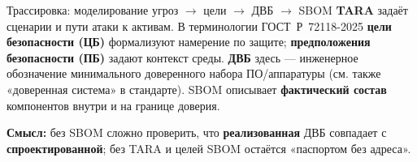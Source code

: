 \documentclass[aspectratio=169,10pt]{beamer}
\begin{document}
\begin{frame}{Трассировка: моделирование угроз $\rightarrow$ цели $\rightarrow$ ДВБ $\rightarrow$ SBOM}
\footnotesize
\textbf{TARA} задаёт сценарии и пути атаки к активам. В терминологии ГОСТ~Р~72118-2025 \textbf{цели безопасности (ЦБ)} формализуют намерение по защите; \textbf{предположения безопасности (ПБ)} задают контекст среды. \textbf{ДВБ} здесь — инженерное обозначение минимального доверенного набора ПО/аппаратуры (см. также «доверенная система» в стандарте). SBOM описывает \textbf{фактический состав} компонентов внутри и на границе доверия.

\vspace{0.25em}
\centering
{}

\vspace{0.35em}
\raggedright
\textbf{Смысл:} без SBOM сложно проверить, что \textbf{реализованная} ДВБ совпадает с \textbf{спроектированной}; без TARA и целей SBOM остаётся «паспортом без адреса».
\end{frame}
\end{document}

